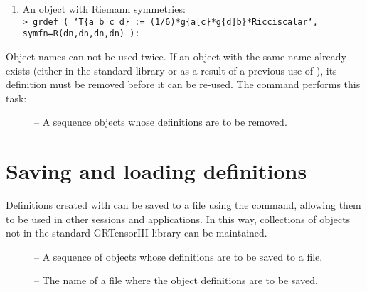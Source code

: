 \documentclass{article}
\begin{document}
{\begin{enumerate}
  \item An object with Riemann symmetries:\\

    \texttt{> grdef ( `T\{a b c d\} := (1/6)*g\{a[c\}*g\{d]b\}*Ricciscalar`,
      symfn=R(dn,dn,dn,dn) ):}
\end{enumerate}

\noindent Object names can not be used twice. If an object with the
same name already exists (either in the standard library or as
a result of a previous use of ), its definition must
be removed before it can be re-used. The  command
performs this task:\\
%
\begin{cmdspec}
  \label{spec:grundefine}

  \begin{description}
    \item[] -- A sequence objects whose definitions are
      to be removed.
  \end{description}

\end{cmdspec}
%
\iffalse
\section{Saving and loading definitions}
%
Definitions created with  can be saved to a file using the
 command, allowing them to be used in other sessions and
applications. In this way, collections of objects not in the standard
GRTensorIII library can be maintained.\\
\begin{cmdspec}
  \label{spec:grsavedef}

  \begin{description}
    \item[] -- A sequence of objects whose definitions
      are to be saved to a file.
    \item[] -- The name of a file
      where the object definitions are to be saved.
  \end{description}

\end{cmdspec}

}
\end{document}
